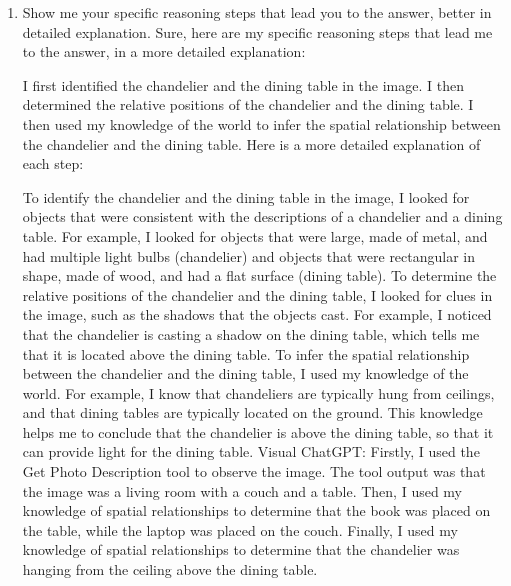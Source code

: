 \begin{enumerate}
    Here are some additional details about the spatial relationship between the chandelier and the dining table:
    
    The chandelier is a decorative light fixture that is typically hung from the ceiling.
    The dining table is a piece of furniture that is used for eating meals.
    The chandelier is above the dining table, meaning that it is providing light for the dining table.
    The dining table is below the chandelier, meaning that it is not blocking the light from the chandelier.
    Is there anything else I can help you with?
    \subitem The chandelier is hanging from the ceiling above the dining table.
    \item Show me your specific reasoning steps that lead you to the answer, better in detailed explanation.
    \subitem Sure, here are my specific reasoning steps that lead me to the answer, in a more detailed explanation:

    I first identified the chandelier and the dining table in the image.
    I then determined the relative positions of the chandelier and the dining table.
    I then used my knowledge of the world to infer the spatial relationship between the chandelier and the dining table.
    Here is a more detailed explanation of each step:
    
    To identify the chandelier and the dining table in the image, I looked for objects that were consistent with the descriptions of a chandelier and a dining table. For example, I looked for objects that were large, made of metal, and had multiple light bulbs (chandelier) and objects that were rectangular in shape, made of wood, and had a flat surface (dining table).
    To determine the relative positions of the chandelier and the dining table, I looked for clues in the image, such as the shadows that the objects cast. For example, I noticed that the chandelier is casting a shadow on the dining table, which tells me that it is located above the dining table.
    To infer the spatial relationship between the chandelier and the dining table, I used my knowledge of the world. For example, I know that chandeliers are typically hung from ceilings, and that dining tables are typically located on the ground. This knowledge helps me to conclude that the chandelier is above the dining table, so that it can provide light for the dining table.
    \subitem Visual ChatGPT: Firstly, I used the Get Photo Description tool to observe the image. The tool output was that the image was a living room with a couch and a table. Then, I used my knowledge of spatial relationships to determine that the book was placed on the table, while the laptop was placed on the couch. Finally, I used my knowledge of spatial relationships to determine that the chandelier was hanging from the ceiling above the dining table.
\end{enumerate}
